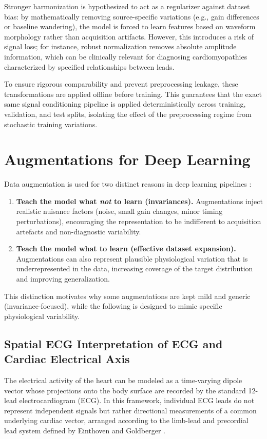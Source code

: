 Stronger harmonization is hypothesized to act as a regularizer against dataset bias: by mathematically removing source-specific variations (e.g., gain differences or baseline wandering), the model is forced to learn features based on waveform morphology rather than acquisition artifacts.
However, this introduces a risk of signal loss; for instance, robust normalization removes absolute amplitude information, which can be clinically relevant for diagnosing cardiomyopathies characterized by specified relationships between leads.

To ensure rigorous comparability and prevent preprocessing leakage, these transformations are applied offline before training.
This guarantees that the exact same signal conditioning pipeline is applied deterministically across training, validation, and test splits, isolating the effect of the preprocessing regime from stochastic training variations.

\section{Augmentations for Deep Learning}
Data augmentation is used for two distinct reasons in deep learning pipelines \parencite{rahman_ecg_augmentation_survey_2023,qiu_augmentation_2022}:
\begin{enumerate}
  \item \textbf{Teach the model what \emph{not} to learn (invariances).} Augmentations inject realistic nuisance factors (noise, small gain changes, minor timing perturbations), encouraging the representation to be indifferent to acquisition artefacts and non-diagnostic variability.
  \item \textbf{Teach the model what to learn (effective dataset expansion).} Augmentations can also represent plausible physiological variation that is underrepresented in the data, increasing coverage of the target distribution and improving generalization.
\end{enumerate}
This distinction motivates why some augmentations are kept mild and generic (invariance-focused), while the following is designed to mimic specific physiological variability.

\subsection{Spatial ECG Interpretation of ECG and Cardiac Electrical Axis}
The electrical activity of the heart can be modeled as a time-varying dipole vector whose projections onto the body surface are recorded by the standard 12-lead electrocardiogram (ECG).
In this framework, individual ECG leads do not represent independent signals but rather directional measurements of a common underlying cardiac vector, arranged according to the limb-lead and precordial lead system defined by Einthoven and Goldberger \parencite{SchusterTrappe2024EKGKurs}.

